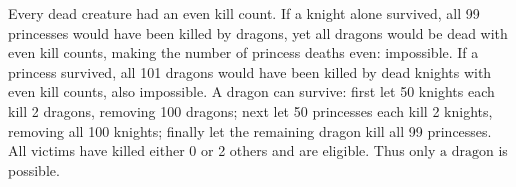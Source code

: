 Every dead creature had an even kill count. If a knight alone survived, all 99 princesses would have been killed by dragons, yet all dragons would be dead with even kill counts, making the number of princess deaths even: impossible. If a princess survived, all 101 dragons would have been killed by dead knights with even kill counts, also impossible. A dragon can survive: first let 50 knights each kill 2 dragons, removing 100 dragons; next let 50 princesses each kill 2 knights, removing all 100 knights; finally let the remaining dragon kill all 99 princesses. All victims have killed either 0 or 2 others and are eligible. Thus only $\boxed{\text{a dragon}}$ is possible.
